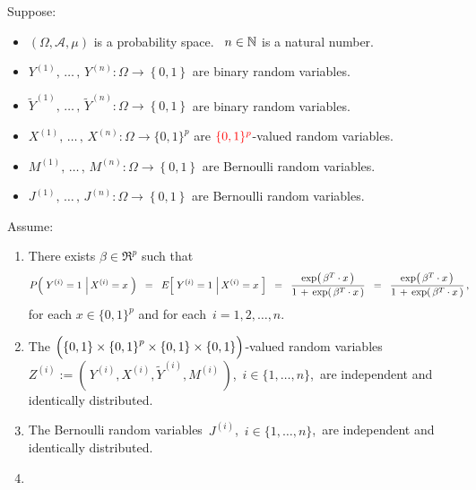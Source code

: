 \vskip 0.5cm
\begin{theorem}\label{ThmLogisticRegressionWithIncorrectData}
\mbox{}\vskip 0.1cm\noindent
Suppose:
\begin{itemize}
\item
	$\left(\Omega,\mathcal{A},\mu\right)$ is a probability space.
	\,
	$n \in \mathbb{N}$ is a natural number.
\item
	$Y^{(1)}, \,\ldots\,,\, Y^{(n)} : \Omega \longrightarrow \left\{0,1\right\}$
	are binary random variables.
\item
	$\widetilde{Y}^{(1)}, \,\ldots\,,\, \widetilde{Y}^{(n)} : \Omega \longrightarrow \left\{0,1\right\}$
	are binary random variables.
\item
	$X^{(1)}, \,\ldots\,,\, X^{(n)} : \Omega \longrightarrow \{0,1\}^{p}$
	are ${\color{red}\{0,1\}^{p}}$-valued random variables.
\item
	$M^{(1)}, \,\ldots\,,\, M^{(n)} : \Omega \longrightarrow \left\{0,1\right\}$
	are Bernoulli random variables.
\item
	$J^{(1)}, \,\ldots\,,\, J^{(n)} : \Omega \longrightarrow \left\{0,1\right\}$
	are Bernoulli random variables.
\end{itemize}
Assume:
\renewcommand{\theenumi}{\alph{enumi}}
\renewcommand{\labelenumi}{\textnormal{(\theenumi)}$\;\;$}
\begin{enumerate}
\item
	There exists $\beta \in \Re^{p}$ such that
	\begin{equation*}
		P\!\left(\; Y^{(i)} = 1 \,\left\vert\, X^{(i)} = x \right.\,\right)
	\;\; = \;\;
		E\!\left[\; Y^{(i)}  = 1 \,\left\vert\, X^{(i)} = x \right.\,\right]
	\;\; = \;\;
		\dfrac{
			\exp\!\left(\,\beta^{T} \cdot x \,\right)
			}{
			1 \,+\, \exp\!\left(\,\beta^{T} \cdot x \,\right)
			}
	\;\; = \;\;
		\dfrac{\exp\!\left(\,\beta^{T} \cdot x \,\right)}{1 \,+\, \exp\!\left(\,\beta^{T} \cdot x \,\right)}\,,
	\quad
	\end{equation*}
	for each $x \in \{0,1\}^{p}$ and for each \,$i = 1,2,\ldots,n$.
\item\label{iIndependence}
	The $\left(\left\{0,1\right\} \overset{{\color{white}.}}{\times} \left\{0,1\right\}^{p} \times \left\{0,1\right\} \times \left\{0,1\right\}\right)$-valued
	random variables
	\,$Z^{(i)} := \left(\,Y^{(i)},X^{(i)},\widetilde{Y}^{(i)},M^{(i)}\,\right)$,
	\,$i \in \{1, \ldots, n\}$,
	\,are independent and identically distributed.
\item\label{Jindependence}
	The Bernoulli random variables \,$J^{(i)}$, \,$i \in \{1, \ldots, n\}$, \,are independent and identically distributed.
\item\label{ZJindependence}

\end{enumerate}
\end{theorem}
